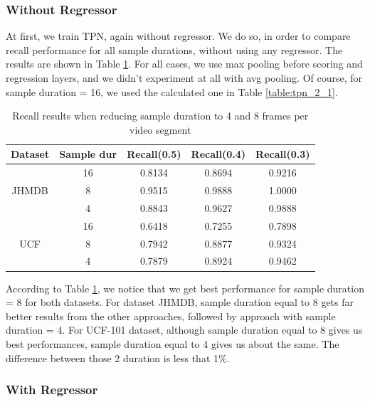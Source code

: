 \subsubsection{Without Regressor}

At first, we train TPN, again without regressor. We do so, in order to compare recall performance for all sample durations, without using any regressor. The results
are shown in Table \ref{table:new_sample}. For all cases, we use max pooling before scoring and regression layers, and we didn't experiment at all with
avg pooling. Of course, for sample duration = 16, we used the calculated one in  Table \ref{table:tpn_2_1}.

\begin{table}[h]
  \centering
  \begin{tabular}{|c | c || c c c|}
    \hline
    \textbf{Dataset} & \textbf{Sample dur} & \textbf{Recall(0.5)} &  \textbf{Recall(0.4)} &  \textbf{Recall(0.3)} \\
    \hline
    \multirow{3}{*}{JHMDB} & 16 & 0.8134 & 0.8694 & 0.9216 \\
    \cline{2-5}
    {} & 8 & 0.9515 & 0.9888 & 1.0000 \\
    \cline{2-5}
    {} & 4 & 0.8843 & 0.9627 & 0.9888 \\
    \hline
    \multirow{3}{*}{UCF} & 16 & 0.6418 & 0.7255 & 0.7898 \\
    \cline{2-5}
    {} & 8 & 0.7942 & 0.8877 & 0.9324\\
    \cline{2-5}
    {} & 4 & 0.7879 & 0.8924 & 0.9462 \\
    \hline
    
  \end{tabular}
  \caption{Recall results when reducing sample duration to 4 and 8 frames per video segment}
  \label{table:new_sample}
\end{table}

According to Table \ref{table:new_sample}, we notice that we get best performance for sample duration = 8 for both datasets. For dataset JHMDB, sample duration equal to 8
gets far better results from the other approaches, followed by approach with sample duration = 4. For UCF-101 dataset, although sample duration equal to 8 gives us best performances,
sample duration equal to 4 gives us about the same. The difference between those 2 duration is less that 1\%. 

\subsubsection{With Regressor}                                             

